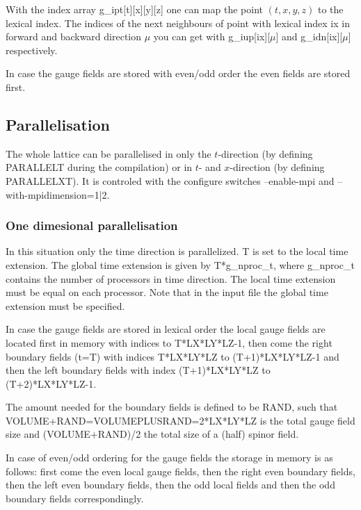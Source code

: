 With the index array {\ttfamily g\_ipt[t][x][y][z]} one can map the
point $(t,x,y,z)$ to the lexical index. The indices of the next
neighbours of point with lexical index {\ttfamily ix} in forward and
backward direction $\mu$ you can get with
{\ttfamily g\_iup[ix][$\mu$]} and {\ttfamily g\_idn[ix][$\mu$]}
respectively.

In case the gauge fields are stored with even/odd order the even
fields are stored first. 

\subsection{Parallelisation}

The whole lattice can be parallelised in only the $t$-direction (by
defining {\ttfamily PARALLELT} during the compilation) or in $t$-
and $x$-direction (by defining {\ttfamily PARALLELXT}).
It is controled with the configure switches {\ttfamily --enable-mpi}
and {\ttfamily --with-mpidimension=1|2}. 

\subsubsection{One dimesional parallelisation}

In this situation only the time direction is parallelized. {\ttfamily
  T} is set to the local time extension. The global time extension is
given by {\ttfamily T*g\_nproc\_t}, where {\ttfamily g\_nproc\_t}
contains the number of processors in time direction. The local time
extension must be equal on each processor. Note that in the input file
the global time extension must be specified. 

In case the gauge fields are stored in lexical order the local gauge
fields are located first in memory with indices { to
  T*LX*LY*LZ-1}, then come the right boundary fields ({\ttfamily t=T})
with indices {\ttfamily T*LX*LY*LZ} to {\ttfamily (T+1)*LX*LY*LZ-1}
and then the left boundary fields with index {\ttfamily
  (T+1)*LX*LY*LZ} to {\ttfamily (T+2)*LX*LY*LZ-1}. 

The amount needed for the boundary fields is defined to be {\ttfamily
  RAND}, such that {\ttfamily VOLUME+RAND=VOLUMEPLUSRAND=2*LX*LY*LZ}
is the total gauge field size and {\ttfamily (VOLUME+RAND)/2} the
total size of a (half) spinor field. 

In case of even/odd ordering for the gauge fields the storage in
memory is as follows: first come the even local gauge fields, then the
right even boundary fields, then the left even boundary fields, then
the odd local fields and then the odd boundary fields correspondingly.

